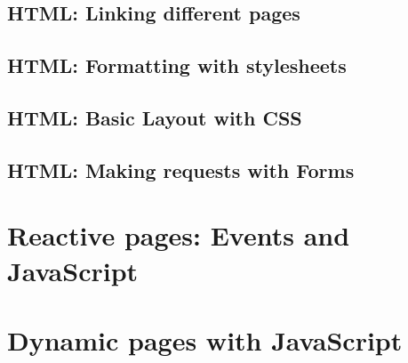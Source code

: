 \documentclass[12pt]{book}
\begin{document}
\chapter{HTML: Linking different pages}

\chapter{HTML: Formatting with stylesheets}

\chapter{HTML: Basic Layout with CSS}

\chapter{HTML: Making requests with Forms}

\part{Reactive pages: Events and JavaScript}

\part{Dynamic pages with JavaScript}
\end{document}
